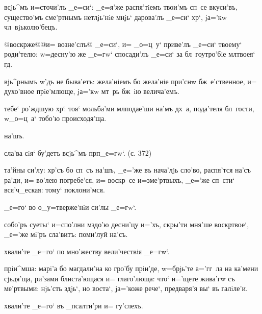 всjь^мъ и=сточи'лъ _е=си`: _е=я'же распя'тiемъ твои'мъ 
сп~се вкуси'въ, существо'мъ сме'ртнымъ нетлjь'нiе мнjь` 
дарова'лъ _е=си` хр`, jа='кw чл~вjьколю'бецъ.

@воскр же@{@и= возне'слъ@} _е=си`, и= _о=ц~у` 
приве'лъ _е=си` твоему` роди'телю: w=десну'ю же _е=гw` 
спосади'лъ _е=си` за бл~гоутро'бiе мл твоея` гд.


вjь^рнымъ w'дъ не быва'етъ: жела'нiемъ бо жела'нiе 
при'снw бж~е'ственное, и= духо'вное прiе'млюще, jа='кw 
мт~рь бж~iю велича'емъ.

тебе` ро'ждшую хр`. тоя` мольба'ми мл подае'ши 
на'мъ дх~а, пода'теля бл~гости, w\т _о=ц~а` тобо'ю 
происходя'ща.

на'шъ. %


сла'ва сiя` бу'детъ всjь^мъ прп _е=гw`. (с. 372)

та'йны си'лу: хр'съ бо сп~съ на'шъ, _е='же въ 
нача'лjь сло'во, распя'тся на'съ ра'ди, и= во'лею 
погребе'ся, и= воскр~се и=з\ъ ме'ртвыхъ, _е='же сп~сти` 
вся'ч_еская: тому` поклони'мся.

_е=го` во о_у=тверже'нiи си'лы _е=гw`.

собо'ръ суеты` и=спо'лни мздо'ю десни'цу и='хъ, скры'ти 
мня'ше воскр твое`, _е='же мi'ръ сла'витъ: поми'луй 
на'съ.

хвали'те _е=го` по мно'жеству вели'чествiя _е=гw`.

прiи^мша: марi'а бо магдали'на ко гро'бу прiи'де, 
w=брjь'те а='гг~ла на ка'мени сjьдя'ща, ри'зами 
блиста'ющася и= глаго'люща: что` и='щете жива'гw съ 
ме'ртвыми: нjь'сть здjь`, но воста`, jа='коже рече`, 
предваря'я вы` въ галiле'и.

хвали'те _е=го` въ _псалти'ри и= гу'слехъ.

